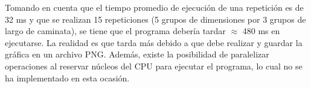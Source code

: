 \documentclass{article}
\begin{document}
Tomando en cuenta que el tiempo promedio de ejecuci\'on de una repetici\'on es de 32 ms y que se realizan 15 repeticiones (5 grupos de dimensiones por 3 grupos de largo de caminata), se tiene que el programa deber\'ia tardar $\approx$ 480 ms en ejecutarse. La realidad es que tarda m\'as debido a que debe realizar y guardar la gr\'afica en un archivo PNG. Adem\'as, existe la posibilidad de paralelizar operaciones al reservar n\'ucleos del CPU para ejecutar el programa, lo cual no se ha implementado en esta ocasi\'on.



\end{document}
